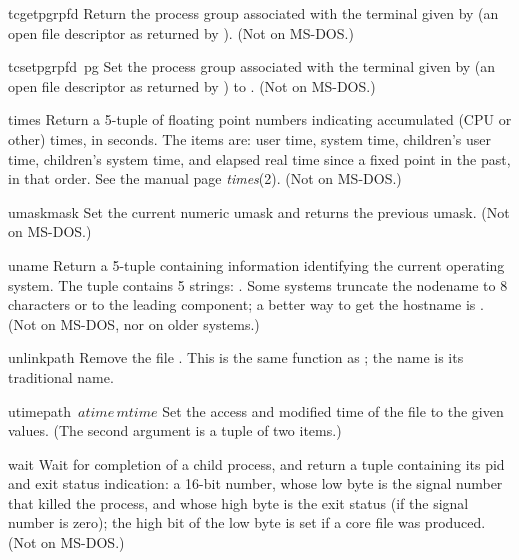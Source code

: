 \begin{funcdesc}{tcgetpgrp}{fd}
Return the process group associated with the terminal given by
 (an open file descriptor as returned by ).
(Not on MS-DOS.)
\end{funcdesc}

\begin{funcdesc}{tcsetpgrp}{fd\, pg}
Set the process group associated with the terminal given by
 (an open file descriptor as returned by )
to .
(Not on MS-DOS.)
\end{funcdesc}

\begin{funcdesc}{times}{}
Return a 5-tuple of floating point numbers indicating accumulated (CPU
or other)
times, in seconds.  The items are: user time, system time, children's
user time, children's system time, and elapsed real time since a fixed
point in the past, in that order.  See the \UNIX{}
manual page {\it times}(2).  (Not on MS-DOS.)
\end{funcdesc}

\begin{funcdesc}{umask}{mask}
Set the current numeric umask and returns the previous umask.
(Not on MS-DOS.)
\end{funcdesc}

\begin{funcdesc}{uname}{}
Return a 5-tuple containing information identifying the current
operating system.  The tuple contains 5 strings:
.
Some systems truncate the nodename to 8
characters or to the leading component; a better way to get the
hostname is .  (Not on MS-DOS, nor on older
\UNIX{} systems.)
\end{funcdesc}

\begin{funcdesc}{unlink}{path}
Remove the file .  This is the same function as ;
the  name is its traditional \UNIX{} name.
\end{funcdesc}

\begin{funcdesc}{utime}{path\, \(atime\, mtime\)}
Set the access and modified time of the file to the given values.
(The second argument is a tuple of two items.)
\end{funcdesc}

\begin{funcdesc}{wait}{}
Wait for completion of a child process, and return a tuple containing
its pid and exit status indication: a 16-bit number, whose low byte is
the signal number that killed the process, and whose high byte is the
exit status (if the signal number is zero); the high bit of the low
byte is set if a core file was produced.  (Not on MS-DOS.)
\end{funcdesc}

